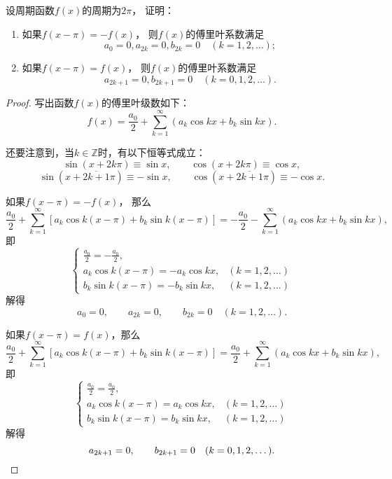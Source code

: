 \begin{example}
设周期函数\(f(x)\)的周期为\(2\pi\)，
证明：\begin{enumerate}
\item 如果\(f(x-\pi) = -f(x)\)，
则\(f(x)\)的傅里叶系数满足\[
	a_0 = 0,
	a_{2k} = 0,
	b_{2k} = 0
	\quad(k=1,2,\dotsc);
\]
\item 如果\(f(x-\pi) = f(x)\)，
则\(f(x)\)的傅里叶系数满足\[
	a_{2k+1} = 0,
	b_{2k+1} = 0
	\quad(k=0,1,2,\dotsc).
\]
\end{enumerate}
\begin{proof}
写出函数\(f(x)\)的傅里叶级数如下：\[
	f(x) = \frac{a_0}{2}
	+ \sum\limits_{k=1}^\infty \left(
		a_k \cos kx
		+ b_k \sin kx
	\right).
\]

还要注意到，当\(k\in\mathbb{Z}\)时，有以下恒等式成立：\[
	\sin(x+2k\pi) \equiv \sin x, \qquad
	\cos(x+2k\pi) \equiv \cos x,
\]\[
	\sin(x+\overline{2k+1}\pi) \equiv -\sin x, \qquad
	\cos(x+\overline{2k+1}\pi) \equiv -\cos x.
\]

如果\(f(x-\pi) = -f(x)\)，
那么\[
	\frac{a_0}{2} + \sum\limits_{k=1}^\infty \left[
		a_k \cos k(x-\pi)
		+ b_k \sin k(x-\pi)
	\right]
	=
	-\frac{a_0}{2} - \sum\limits_{k=1}^\infty \left(
		a_k \cos kx
		+ b_k \sin kx
	\right),
\]
即\[
	\left\{ \begin{array}{ll}
		\frac{a_0}{2} = -\frac{a_0}{2}, \\
		a_k \cos k(x-\pi) = - a_k \cos kx, &(k=1,2,\dotsc) \\
		b_k \sin k(x-\pi) = - b_k \sin kx, &(k=1,2,\dotsc)
	\end{array} \right.
\]
解得\[
	a_0 = 0, \qquad
	a_{2k} = 0, \qquad
	b_{2k} = 0
	\quad(k=1,2,\dotsc).
\]

如果\(f(x-\pi) = f(x)\)，那么\[
	\frac{a_0}{2} + \sum\limits_{k=1}^\infty \left[
		a_k \cos k(x-\pi)
		+ b_k \sin k(x-\pi)
	\right]
	=
	\frac{a_0}{2} + \sum\limits_{k=1}^\infty \left(
		a_k \cos kx
		+ b_k \sin kx
	\right),
\]
即\[
	\left\{ \begin{array}{ll}
		\frac{a_0}{2} = \frac{a_0}{2}, \\
		a_k \cos k(x-\pi) = a_k \cos kx, &(k=1,2,\dotsc) \\
		b_k \sin k(x-\pi) = b_k \sin kx, &(k=1,2,\dotsc)
	\end{array} \right.
\]
解得\[
	a_{2k+1} = 0, \qquad
	b_{2k+1} = 0
	\quad(k=0,1,2,\dotsc).
	\qedhere
\]
\end{proof}
\end{example}

